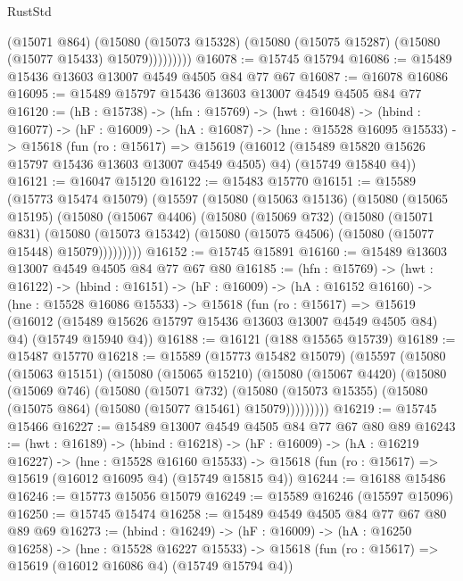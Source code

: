 \begin{lexlean}{RustStd}
\begin{coremodule}
                (@15071 @864)
                (@15080
                  (@15073 @15328)
                  (@15080 (@15075 @15287) (@15080 (@15077 @15433) @15079)))))))))
@16078 := @15745 @15794
@16086 := @15489 @15436 @13603 @13007 @4549 @4505 @84 @77 @67
@16087 := @16078 @16086
@16095 := @15489 @15797 @15436 @13603 @13007 @4549 @4505 @84 @77
@16120 := (hB : @15738) ->
  (hfn : @15769) ->
  (hwt : @16048) ->
  (hbind : @16077) ->
  (hF : @16009) ->
  (hA : @16087) ->
  (hne : @15528 @16095 @15533) ->
  @15618
    (fun (ro : @15617) =>
    @15619
      (@16012 (@15489 @15820 @15626 @15797 @15436 @13603 @13007 @4549 @4505) @4)
      (@15749 @15840 @4))
@16121 := @16047 @15120
@16122 := @15483 @15770
@16151 := @15589
    (@15773 @15474 @15079)
    (@15597
      (@15080
        (@15063 @15136)
        (@15080
          (@15065 @15195)
          (@15080
            (@15067 @4406)
            (@15080
              (@15069 @732)
              (@15080
                (@15071 @831)
                (@15080
                  (@15073 @15342)
                  (@15080 (@15075 @4506) (@15080 (@15077 @15448) @15079)))))))))
@16152 := @15745 @15891
@16160 := @15489 @13603 @13007 @4549 @4505 @84 @77 @67 @80
@16185 := (hfn : @15769) ->
  (hwt : @16122) ->
  (hbind : @16151) ->
  (hF : @16009) ->
  (hA : @16152 @16160) ->
  (hne : @15528 @16086 @15533) ->
  @15618
    (fun (ro : @15617) =>
    @15619
      (@16012 (@15489 @15626 @15797 @15436 @13603 @13007 @4549 @4505 @84) @4)
      (@15749 @15940 @4))
@16188 := @16121 (@188 @15565 @15739)
@16189 := @15487 @15770
@16218 := @15589
    (@15773 @15482 @15079)
    (@15597
      (@15080
        (@15063 @15151)
        (@15080
          (@15065 @15210)
          (@15080
            (@15067 @4420)
            (@15080
              (@15069 @746)
              (@15080
                (@15071 @732)
                (@15080
                  (@15073 @15355)
                  (@15080 (@15075 @864) (@15080 (@15077 @15461) @15079)))))))))
@16219 := @15745 @15466
@16227 := @15489 @13007 @4549 @4505 @84 @77 @67 @80 @89
@16243 := (hwt : @16189) ->
  (hbind : @16218) ->
  (hF : @16009) ->
  (hA : @16219 @16227) ->
  (hne : @15528 @16160 @15533) ->
  @15618 (fun (ro : @15617) => @15619 (@16012 @16095 @4) (@15749 @15815 @4))
@16244 := @16188 @15486
@16246 := @15773 @15056 @15079
@16249 := @15589 @16246 (@15597 @15096)
@16250 := @15745 @15474
@16258 := @15489 @4549 @4505 @84 @77 @67 @80 @89 @69
@16273 := (hbind : @16249) ->
  (hF : @16009) ->
  (hA : @16250 @16258) ->
  (hne : @15528 @16227 @15533) ->
  @15618 (fun (ro : @15617) => @15619 (@16012 @16086 @4) (@15749 @15794 @4))

\end{coremodule}
\end{lexlean}
